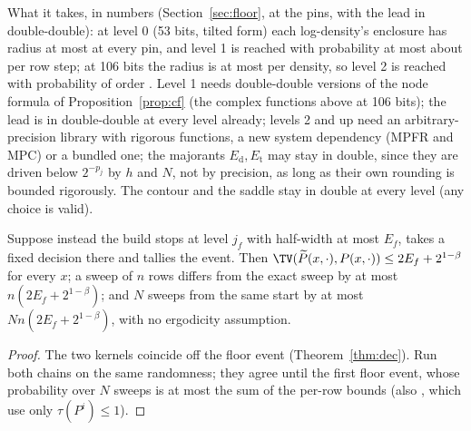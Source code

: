 What it takes, in numbers (Section~\ref{sec:floor}, at the pins, with the lead in double-double): at level 0 (53 bits, tilted form) each log-density's
enclosure has radius at most \FLOORDENS{} at every pin, and level 1 is reached with probability at most about
\FLOORSTEP{} per row step; at 106 bits the radius is at most \FLOORHI{}
per density, so level 2 is reached with probability of order \FLOORHISTEP. Level 1 needs double-double versions of the
node formula of Proposition~\ref{prop:cf} (the complex functions above at 106 bits); the lead is in double-double
at every level already; levels 2 and up need an
arbitrary-precision library with rigorous functions, a new system dependency (MPFR and MPC) or a bundled one; the
majorants $E_{\mathrm d},E_{\mathrm t}$ may stay in double, since they are driven below $2^{-p_j}$ by $h$ and $N$,
not by precision, as long as their own rounding is bounded rigorously. The contour and the saddle stay in double
at every level (any choice is valid).

\begin{proposition}\label{prop:floor}
Suppose instead the build stops at level $j_f$ with half-width at most $E_f$, takes a fixed decision there and
tallies the event. Then $\TV(\widetilde P(x,\cdot),P(x,\cdot))\le2E_f+2^{1-\beta}$ for every $x$; a sweep of $n$
rows differs from the exact sweep by at most $n(2E_f+2^{1-\beta})$; and $N$ sweeps from the same start by at most
$Nn(2E_f+2^{1-\beta})$, with no ergodicity assumption.
\end{proposition}
\begin{proof}
The two kernels coincide off the floor event (Theorem~\ref{thm:dec}). Run both chains on the same randomness; they
agree until the first floor event, whose probability over $N$ sweeps is at most the sum of the per-row bounds
(also \cite[eqs.~(3.3)--(3.4)]{mitro}, which use only $\tau(P^i)\le1$).
\end{proof}

